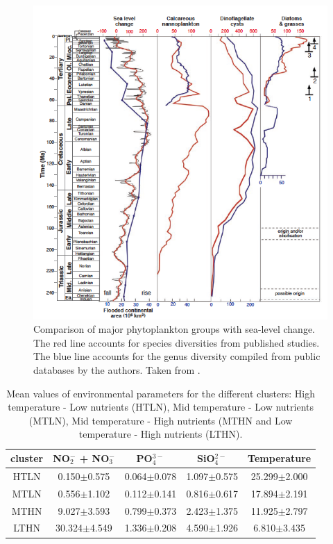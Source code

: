 \begin{figure}
\centering
\includegraphics[trim = 0mm 0mm 0mm 0mm, clip, width=1\linewidth]{./Chp3-Further/Falkowski-2004.png}
\caption[Scheme]{\small {Comparison of major phytoplankton groups with sea-level change. The red line accounts for species diversities from published studies. The blue line accounts for the genus diversity compiled from public databases by the authors. Taken from \citet{Falkowski2004a}. }}
\label{Falkowski}
\end{figure}




\begin{table}
\centering
\caption[Scheme]{\small {Mean values of environmental parameters for the different clusters: High temperature - Low nutrients (HTLN), Mid temperature - Low nutrients (MTLN), Mid temperature - High nutrients (MTHN and Low temperature - High nutrients (LTHN).}}
\label{tableclus}
\begin{tabular} {c c c c c}
cluster & NO$_2^-$ + NO$_3^-$ & PO$_4^{3-}$ & SiO$_4^{2-}$ & Temperature \\ \hline
HTLN & 0.150$\pm$0.575 & 0.064$\pm$0.078 & 1.097$\pm$0.575 & 25.299$\pm$2.000 \\
MTLN & 0.556$\pm$1.102 & 0.112$\pm$0.141 & 0.816$\pm$0.617 & 17.894$\pm$2.191 \\
MTHN & 9.027$\pm$3.593 & 0.799$\pm$0.373 & 2.423$\pm$1.375 & 11.925$\pm$2.797 \\
LTHN & 30.324$\pm$4.549 & 1.336$\pm$0.208 & 4.590$\pm$1.926 & 6.810$\pm$3.435 \\ \hline
\end{tabular}
\end{table}



